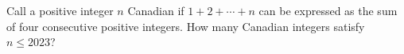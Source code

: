Call a positive integer $n$ Canadian if $1+2+\cdots+n$ can be expressed as the sum of four consecutive positive integers. How many Canadian integers satisfy $n\le2023$?
